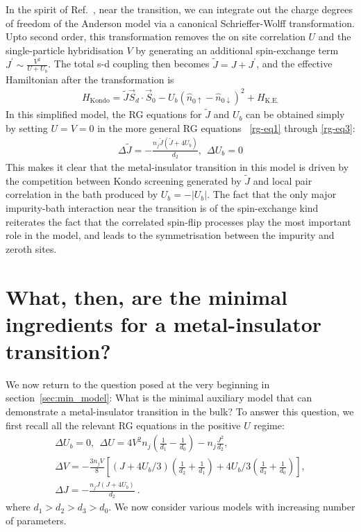 In the spirit of Ref.~\cite{moeller_1995}, near the transition, we can integrate out the charge degrees of freedom of the Anderson model via a canonical Schrieffer-Wolff transformation. Upto second order, this transformation removes the on site correlation \(U\) and the single-particle hybridisation \(V\) by generating an additional spin-exchange term \(J^\prime \sim \frac{V^2}{U+U_b}\). The total s-d coupling then becomes \(\widetilde J = J + J^\prime\), and the effective Hamiltonian after the transformation is
\begin{equation}\begin{aligned}
	H_\text{Kondo} = \widetilde J \vec{S}_d\cdot\vec{S}_0 - U_b\left( \hat n_{0 \uparrow} - \hat n_{0 \downarrow} \right)^2 + H_\text{K.E.}
\end{aligned}\end{equation}
In this simplified model, the RG equations for \(\widetilde J\) and \(U_b\) can be obtained simply by setting \(U =V = 0\) in the more general RG equations ~\ref{rg-eq1} through \ref{rg-eq3}:
\begin{equation}\begin{aligned}
	\Delta \widetilde J = -\frac{n_j \widetilde J\left(\widetilde J + 4U_b\right)}{d_2},~~ \Delta U_b = 0
\end{aligned}\end{equation}
This makes it clear that the metal-insulator transition in this model is driven by the competition between Kondo screening generated by \(\tilde J\) and local pair correlation in the bath produced by \(U_b = -|U_b|\). The fact that the only major impurity-bath interaction near the transition is of the spin-exchange kind reiterates the fact that the correlated spin-flip processes play the most important role in the model, and leads to the symmetrisation between the impurity and zeroth sites.

\section{What, then, are the minimal ingredients for a metal-insulator transition?}
We now return to the question posed at the very beginning in section~\ref{sec:min_model}: What is the minimal auxiliary model that can demonstrate a metal-insulator transition in the bulk? To answer this question, we first recall all the relevant RG equations in the positive \(U\) regime:
\begin{gather}
	\Delta U_b = 0, ~ ~\Delta U = 4V^2 n_j\left(\frac{1}{d_1} - \frac{1}{d_0}\right) - n_j\frac{J^2}{d_2},\\
	\Delta V = -\frac{3n_j V}{8}\left[\left(J + 4U_b/3\right) \left(\frac{1}{d_2} + \frac{1}{d_1}\right) + 4U_b/3\left(\frac{1}{d_3} + \frac{1}{d_0}\right)\right],\\
	\Delta J = -\frac{n_j J\left(J + 4U_b\right)}{d_2}~.
\end{gather}
where \(d_1 > d_2 > d_3 > d_0\).
We now consider various models with increasing number of parameters.

